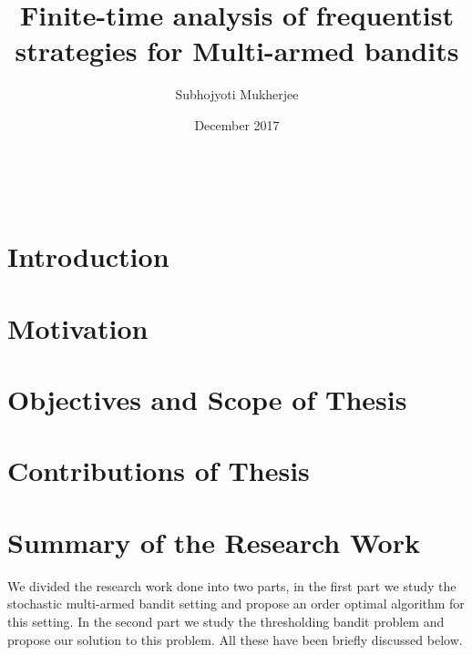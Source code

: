 \documentclass[MS,synopsis]{iitmdiss}
\title{Finite-time analysis of frequentist strategies for Multi-armed bandits}
\author{Subhojyoti Mukherjee}
\date{December 2017}
\begin{document}
\maketitle

\newpage
\
\thispagestyle{empty}
\clearpage

\setcounter{page}{1}



\section{Introduction}
\label{synopsis:intro}


\section{Motivation}
\label{synopsis:motivation}


\section{Objectives and Scope of Thesis}
\label{synopsis:objThesis}


\section{Contributions of Thesis}
\label{synopsis:contriThesis}


%
%

\section{Summary of the Research Work}

We divided the research work done into two parts, in the first part we study the stochastic multi-armed bandit setting and propose an order optimal algorithm for this setting. In the second part we study the thresholding bandit problem and propose our solution to this problem. All these have been briefly discussed below.

\end{document}
